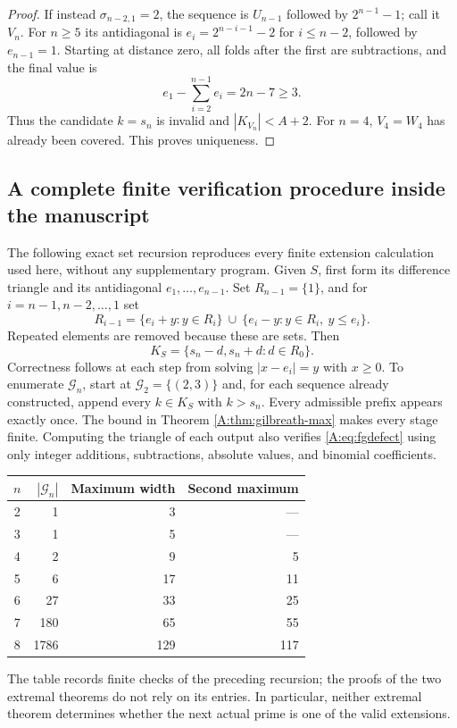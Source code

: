 \documentclass[11pt,a4paper]{article}
\theoremstyle{definition}
\theoremstyle{remark}
\numberwithin{equation}{section}
\begin{document}
\begin{proof}
If instead $\sigma_{n-2,1}=2$, the sequence is $U_{n-1}$ followed
by $2^{n-1}-1$; call it $V_n$. For $n\ge5$ its antidiagonal is
$e_i=2^{n-i-1}-2$ for $i\le n-2$, followed by $e_{n-1}=1$.
Starting at distance zero, all folds after the first are subtractions,
and the final value is
\[
 e_1-\sum_{i=2}^{n-1}e_i=2n-7\ge3.
\]
Thus the candidate $k=s_n$ is invalid and $|K_{V_n}|<A+2$.
For $n=4$, $V_4=W_4$ has already been covered. This proves uniqueness.
\end{proof}

\subsection{A complete finite verification procedure inside the manuscript}
The following exact set recursion reproduces every finite extension
calculation used here, without any supplementary program. Given $S$,
first form its difference triangle and its antidiagonal $e_1,\ldots,e_{n-1}$.
Set $R_{n-1}=\{1\}$, and for $i=n-1,n-2,\ldots,1$ set
\[
 R_{i-1}=\{e_i+y:y\in R_i\}
       \ \cup\ \{e_i-y:y\in R_i,\ y\le e_i\}.
\]
Repeated elements are removed because these are sets. Then
\[
 K_S=\{s_n-d,s_n+d:d\in R_0\}.
\]
Correctness follows at each step from solving $|x-e_i|=y$ with
$x\ge0$. To enumerate $\mathcal G_n$, start at
$\mathcal G_2=\{(2,3)\}$ and, for each sequence already constructed,
append every $k\in K_S$ with $k>s_n$. Every admissible prefix appears
exactly once. The bound in Theorem \ref{A:thm:gilbreath-max} makes every
stage finite. Computing the triangle of each output also verifies
\eqref{A:eq:fgdefect} using only integer additions, subtractions,
absolute values, and binomial coefficients.

\begin{center}
\begin{tabular}{c r r r}
\toprule
$n$ & $|\mathcal G_n|$ & Maximum width & Second maximum\\
\midrule
2&1&3&---\\
3&1&5&---\\
4&2&9&5\\
5&6&17&11\\
6&27&33&25\\
7&180&65&55\\
8&1786&129&117\\
\bottomrule
\end{tabular}
\end{center}
The table records finite checks of the preceding recursion; the proofs
of the two extremal theorems do not rely on its entries. In particular,
neither extremal theorem determines whether the next actual prime is
one of the valid extensions.
\end{document}
